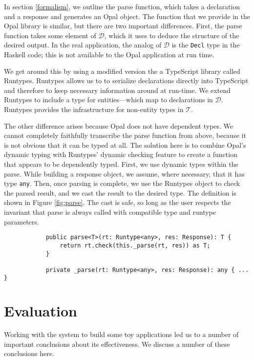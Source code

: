 \documentclass[twocolumn]{article}
\newcommand{\ts}[1]{\texttt{#1}}
\newcommand{\hs}[1]{\texttt{#1}}
\newcommand{\fcy}[1]{\mathcal{#1}}
\newcommand{\ff}[1]{\textsf{#1}}
\begin{document}
In section \ref{formalism}, we outline the parse function, which takes a
declaration and a response and generates an Opal object. The function that we
provide in the Opal library is similar, but there are two important differences.
First, the parse function takes some element of $\fcy{D}$, which it uses to
deduce the structure of the desired output. In the real application, the analog
of $\fcy{D}$ is the \hs{Decl} type in the Haskell code; this is not available to
the Opal application at run time.

We get around this by using a modified version the a TypeScript library called
Runtypes.\cite{runtypes} Runtypes allows us to to serialize declarations
directly into TypeScript and therefore to keep necessary information around at
run-time. We extend Runtypes to include a type for entities---which map to
declarations in $\fcy{D}$. Runtypes provides the infrastructure for non-entity
types in $\fcy{T}$.

The other difference arises because Opal does not have dependent types. We
cannot completely faithfully transcribe the \ff{parse} function from above,
because it is not obvious that it can be typed at all. The solution here is to
combine Opal's dynamic typing with Runtypes' dynamic checking feature to create
a function that appears to be dependently typed. First, we use dynamic types
within the \ff{parse}. While building a response object, we assume, where
necessary, that it has type \ts{any}. Then, once parsing is complete, we use the
Runtypes object to check the parsed result, and we cast the result to the
desired type. The definition is shown in Figure \ref{fig:parse}. The cast is
safe, so long as the user respects the invariant that parse is always called
with compatible type and runtype parameters.

\begin{figure*}
\begin{verbatim}
            public parse<T>(rt: Runtype<any>, res: Response): T {
                return rt.check(this._parse(rt, res)) as T;
            }

            private _parse(rt: Runtype<any>, res: Response): any { ... }
\end{verbatim}
  \caption{The wit parse functions.}
  \label{fig:parse}
\end{figure*}

\section{Evaluation} \label{evaluation}
Working with the system to build some toy applications led us to a number of
important conclusions about its effectiveness. We discuss a number of these
conclusions here.
\end{document}
